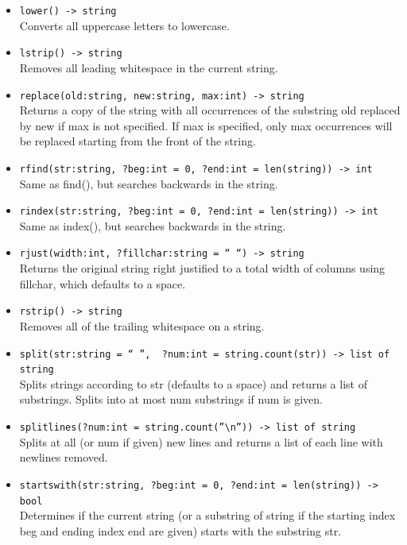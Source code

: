 \documentclass{article}
\begin{document}
\begin{itemize}
\item \verb|lower() -> string| \\
    Converts all uppercase letters to lowercase. 

\item \verb|lstrip() -> string| \\
    Removes all leading whitespace in the current string. 

\item \verb|replace(old:string, new:string, max:int) -> string| \\
Returns a copy of the string with all occurrences of the substring old replaced by new if max is not specified. If max is specified, only max occurrences will be replaced starting from the front of the string. 

\item \verb|rfind(str:string, ?beg:int = 0, ?end:int = len(string)) -> int| \\
    Same as find(), but searches backwards in the string.

\item \verb|rindex(str:string, ?beg:int = 0, ?end:int = len(string)) -> int| \\
    Same as index(), but searches backwards in the string. 

\item \verb|rjust(width:int, ?fillchar:string = “ “) -> string| \\
Returns the original string right justified to a total width of columns using fillchar, which defaults to a space. 

\item \verb|rstrip() -> string| \\
    Removes all of the trailing whitespace on a string. 

\item \verb|split(str:string = “ ”,  ?num:int = string.count(str)) -> list of string| \\
Splits strings according to str (defaults to a space) and returns a list of substrings. Splits into at most num substrings if num is given. 

\item \verb|splitlines(?num:int = string.count(”\n”)) -> list of string| \\
Splits at all (or num if given) new lines and returns a list of each line with newlines removed. 

\item \verb|startswith(str:string, ?beg:int = 0, ?end:int = len(string)) -> bool| \\
Determines if the current string (or a substring of string if the starting index beg and ending index end are given) starts with the substring str. 


\end{itemize}
\end{document}
